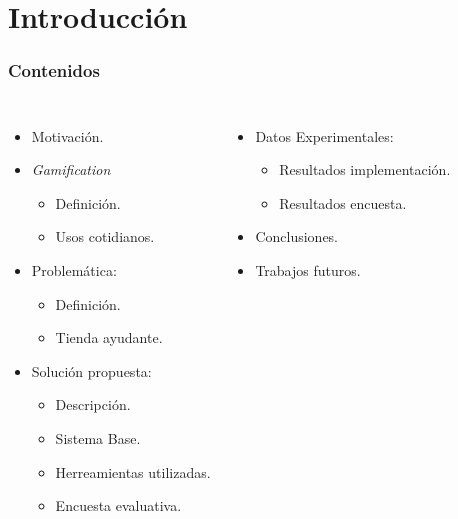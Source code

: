 \documentclass[10pt, compress]{beamer}
\begin{document}
\section{Introducción}

\begin{frame}[fragile]
  \frametitle{Contenidos}

\begin{columns}[onlytextwidth]
  \begin{itemize}[<+- | alert@+>]
    \item Motivación.
    \item \emph{Gamification}
	\begin{itemize}[<+- | alert@+>]
	  \item Definición.
	  \item Usos cotidianos.
	\end{itemize}
    \item Problemática:
	\begin{itemize}[<+- | alert@+>]
          \item Definición.
          \item Tienda ayudante.
        \end{itemize}
    \item Solución propuesta:
	\begin{itemize}[<+- | alert@+>]
          \item Descripción.
          \item Sistema Base.
	  \item Herreamientas utilizadas.
	  \item Encuesta evaluativa.
        \end{itemize}
\end{itemize}

  \begin{itemize}[<+- | alert@+>]
    \item Datos Experimentales:
	\begin{itemize}[<+- | alert@+>]
          \item Resultados implementación.
          \item Resultados encuesta.
        \end{itemize}
    \item Conclusiones.
    \item Trabajos futuros.
  \end{itemize}
\end{columns}
\end{frame}
\end{document}
